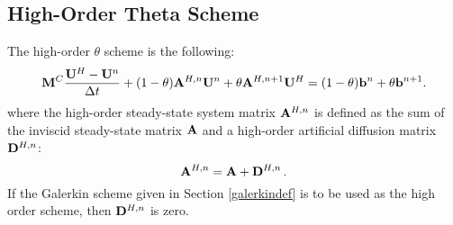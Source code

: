 \subsection{High-Order Theta Scheme}
The high-order $\theta$ scheme is the following:
\begin{equation}\label{high_theta}
  \mathbf{M}^C\frac{\mathbf{U}^H-\mathbf{U}^n}{\Delta t}
  + (1-\theta)\mathbf{A}^{H,n}\mathbf{U}^n + \theta\mathbf{A}^{H,n+1}\mathbf{U}^H
  = (1-\theta)\mathbf{b}^n + \theta\mathbf{b}^{n+1}.
\end{equation}
where the high-order steady-state system matrix $\mathbf{A}^{H,n}$ is
defined as the sum of the inviscid steady-state matrix $\mathbf{A}$
and a high-order artificial diffusion matrix $\mathbf{D}^{H,n}$:
\begin{equation}
   \mathbf{A}^{H,n} = \mathbf{A} + \mathbf{D}^{H,n} \,.
\end{equation}
If the Galerkin scheme given in Section \ref{galerkindef} is to be
used as the high order scheme, then $\mathbf{D}^{H,n}$ is zero.
